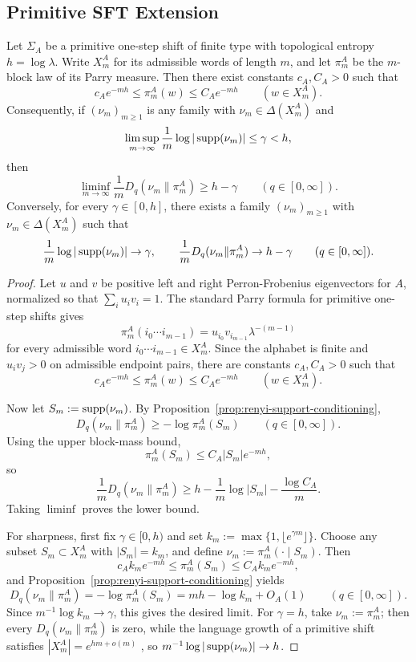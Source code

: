 \subsection{Primitive SFT Extension}

\begin{theorem}
\label{thm:primitive-sft-renyi-barrier}
Let \(\Sigma_A\) be a primitive one-step shift of finite type with topological
entropy \(h=\log\lambda\). Write \(X_m^A\) for its admissible words of length
\(m\), and let \(\pi_m^A\) be the \(m\)-block law of its Parry measure. Then
there exist constants \(c_A,C_A>0\) such that
\[
c_A e^{-mh}\le \pi_m^A(w)\le C_A e^{-mh}
\qquad (w\in X_m^A).
\]
Consequently, if \((\nu_m)_{m\ge 1}\) is any family with
\(\nu_m\in\Delta(X_m^A)\) and
\[
\limsup_{m\to\infty}\frac{1}{m}\log |\operatorname{supp}(\nu_m)|\le \gamma<h,
\]
then
\[
\liminf_{m\to\infty}\frac{1}{m}D_q(\nu_m\|\pi_m^A)\ge h-\gamma
\qquad (q\in[0,\infty]).
\]
Conversely, for every \(\gamma\in[0,h]\), there exists a family
\((\nu_m)_{m\ge 1}\) with \(\nu_m\in\Delta(X_m^A)\) such that
\[
\frac{1}{m}\log |\operatorname{supp}(\nu_m)|\to \gamma,
\qquad
\frac{1}{m}D_q(\nu_m\|\pi_m^A)\to h-\gamma
\qquad (q\in[0,\infty]).
\]
\end{theorem}

\begin{proof}
Let \(u\) and \(v\) be positive left and right Perron-Frobenius eigenvectors
for \(A\), normalized so that \(\sum_i u_i v_i=1\). The standard Parry formula
for primitive one-step shifts \cite{LindMarcus1995,ParryPollicott1990Zeta}
gives
\[
\pi_m^A(i_0\cdots i_{m-1})=u_{i_0}v_{i_{m-1}}\lambda^{-(m-1)}
\]
for every admissible word \(i_0\cdots i_{m-1}\in X_m^A\). Since the alphabet is
finite and \(u_i v_j>0\) on admissible endpoint pairs, there are constants
\(c_A,C_A>0\) such that
\[
c_A e^{-mh}\le \pi_m^A(w)\le C_A e^{-mh}
\qquad (w\in X_m^A).
\]

Now let \(S_m:=\operatorname{supp}(\nu_m)\). By
Proposition~\ref{prop:renyi-support-conditioning},
\[
D_q(\nu_m\|\pi_m^A)\ge -\log \pi_m^A(S_m)
\qquad (q\in[0,\infty]).
\]
Using the upper block-mass bound,
\[
\pi_m^A(S_m)\le C_A |S_m| e^{-mh},
\]
so
\[
\frac{1}{m}D_q(\nu_m\|\pi_m^A)
\ge
h-\frac{1}{m}\log |S_m|-\frac{\log C_A}{m}.
\]
Taking \(\liminf\) proves the lower bound.

For sharpness, first fix \(\gamma\in[0,h)\) and set
\(k_m:=\max\{1,\lfloor e^{\gamma m}\rfloor\}\). Choose any subset
\(S_m\subset X_m^A\) with \(|S_m|=k_m\), and define
\(\nu_m:=\pi_m^A(\cdot\mid S_m)\). Then
\[
c_A k_m e^{-mh}
\le
\pi_m^A(S_m)
\le
C_A k_m e^{-mh},
\]
and Proposition~\ref{prop:renyi-support-conditioning} yields
\[
D_q(\nu_m\|\pi_m^A)=-\log \pi_m^A(S_m)=mh-\log k_m+O_A(1)
\qquad (q\in[0,\infty]).
\]
Since \(m^{-1}\log k_m\to \gamma\), this gives the desired limit. For
\(\gamma=h\), take \(\nu_m:=\pi_m^A\); then every \(D_q(\nu_m\|\pi_m^A)\) is
zero, while the language growth of a primitive shift satisfies
\(|X_m^A|=e^{hm+o(m)}\) \cite{LindMarcus1995}, so
\(m^{-1}\log |\operatorname{supp}(\nu_m)|\to h\).
\end{proof}

